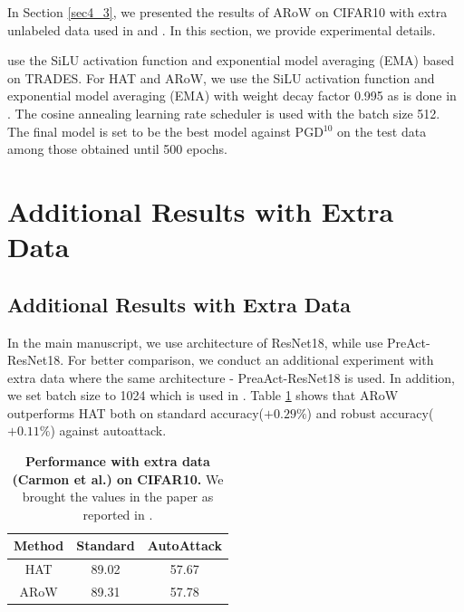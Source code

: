\documentclass[nohyperref]{article}
\theoremstyle{plain}
\theoremstyle{definition}
\theoremstyle{remark}
\begin{document}
In Section \ref{sec4_3}, we presented the results of ARoW on CIFAR10 with extra unlabeled data used in \citet{carmon2019unlabeled} and \citet{rebuffi2021data}.
In this section, we provide experimental details.

\citet{rebuffi2021data} use the SiLU activation function and exponential model averaging (EMA) based on TRADES.
For HAT \citep{rade2022reducing} and ARoW, we use the SiLU activation function and exponential model averaging (EMA) with weight decay factor 0.995 as is done in \citet{rebuffi2021data}.
The cosine annealing learning rate scheduler \citep{loshchilov2017sgdr} is used with the batch size 512. The final model is set to be the best model against PGD$^{10}$ on the test data among those obtained until 500 epochs.

\section{Additional Results with Extra Data}

\subsection{Additional Results with Extra Data}


In the main manuscript, we use architecture of ResNet18, while \citet{rade2022reducing} use PreAct-ResNet18.
For better comparison, we conduct an additional experiment with extra data where the same architecture - PreaAct-ResNet18 is used. In addition, we set batch size to 1024 which is used in \citet{rade2022reducing}.
Table \ref{tab:ex} shows that ARoW outperforms HAT both on standard accuracy($+0.29\%$) and robust accuracy($+0.11\%$) against autoattack.


\begin{table}[H]
        \caption{\textbf{Performance with extra data (Carmon et al.) on CIFAR10.} We brought the values in the paper as reported in \citet{rade2022reducing}.}\label{tab:ex}
        \centering
        \begin{tabular}{c|cc}
        \hline
        \textbf{Method} & \textbf{Standard} & \textbf{AutoAttack}  \\
        \hline
        \hline
        HAT                        & 89.02 & 57.67 \\
        ARoW           & 89.31 & 57.78 \\
        \hline
        \end{tabular}
\end{table}
\end{document}
